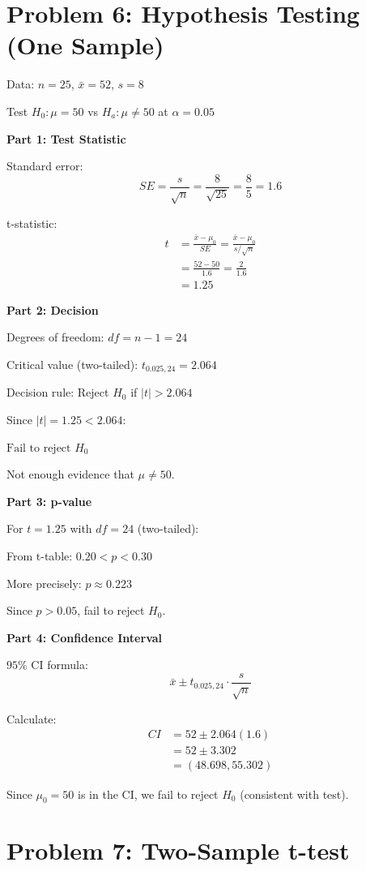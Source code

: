\documentclass[10pt,twocolumn]{article}
\begin{document}
\section*{Problem 6: Hypothesis Testing (One Sample)}

Data: $n = 25$, $\bar{x} = 52$, $s = 8$

Test $H_0: \mu = 50$ vs $H_a: \mu \neq 50$ at $\alpha = 0.05$

\textbf{Part 1: Test Statistic}

Standard error:
$$SE = \frac{s}{\sqrt{n}} = \frac{8}{\sqrt{25}} = \frac{8}{5} = 1.6$$

t-statistic:
\begin{align*}
t &= \frac{\bar{x} - \mu_0}{SE} = \frac{\bar{x} - \mu_0}{s/\sqrt{n}} \\
&= \frac{52 - 50}{1.6} = \frac{2}{1.6} \\
&= \boxed{1.25}
\end{align*}

\textbf{Part 2: Decision}

Degrees of freedom: $df = n - 1 = 24$

Critical value (two-tailed): $t_{0.025,24} = 2.064$

Decision rule: Reject $H_0$ if $|t| > 2.064$

Since $|t| = 1.25 < 2.064$:

$\boxed{\text{Fail to reject } H_0}$

Not enough evidence that $\mu \neq 50$.

\textbf{Part 3: p-value}

For $t = 1.25$ with $df = 24$ (two-tailed):

From t-table: $0.20 < p < 0.30$

More precisely: $\boxed{p \approx 0.223}$

Since $p > 0.05$, fail to reject $H_0$.

\textbf{Part 4: Confidence Interval}

$95\%$ CI formula:
$$\bar{x} \pm t_{0.025,24} \cdot \frac{s}{\sqrt{n}}$$

Calculate:
\begin{align*}
CI &= 52 \pm 2.064(1.6) \\
&= 52 \pm 3.302 \\
&= \boxed{(48.698, 55.302)}
\end{align*}

Since $\mu_0 = 50$ is in the CI, we fail to reject $H_0$ (consistent with test).

\section*{Problem 7: Two-Sample t-test}
\end{document}
